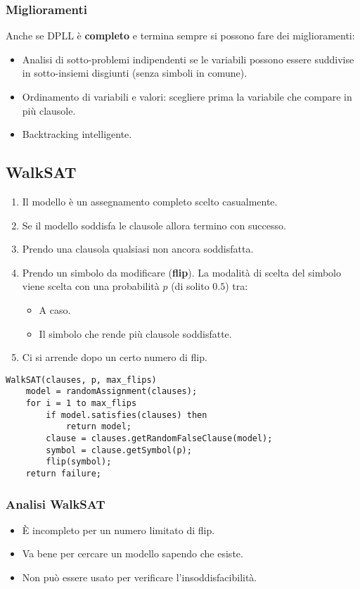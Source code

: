 \subsubsection{Miglioramenti}
Anche se DPLL \`e \textbf{completo} e termina sempre si possono fare dei miglioramenti:
\begin{itemize}
	\item Analisi di sotto-problemi indipendenti se le variabili possono essere suddivise in sotto-insiemi disgiunti
	      (senza simboli in comune).
	\item Ordinamento di variabili e valori: scegliere prima la variabile che compare in pi\`u clausole.
	\item Backtracking intelligente.
\end{itemize}

\subsection{WalkSAT}
\begin{enumerate}
	\item Il modello \`e un assegnamento completo scelto casualmente.
	\item Se il modello soddisfa le clausole allora termino con successo.
	\item Prendo una clausola qualsiasi non ancora soddisfatta.
	\item Prendo un simbolo da modificare (\textbf{flip}). La modalit\`a di scelta del simbolo viene scelta con
	      una probabilit\`a $p$ (di solito $0.5$) tra:
	      \begin{itemize}
		      \item A caso.
		      \item Il simbolo che rende pi\`u clausole soddisfatte.
	      \end{itemize}
	\item Ci si arrende dopo un certo numero di flip.
\end{enumerate}

\begin{lstlisting}[style=pseudo-style]
WalkSAT(clauses, p, max_flips)
	model = randomAssignment(clauses);
	for i = 1 to max_flips
		if model.satisfies(clauses) then
			return model;
		clause = clauses.getRandomFalseClause(model);
		symbol = clause.getSymbol(p);
		flip(symbol);
	return failure;
\end{lstlisting}

\subsubsection{Analisi WalkSAT}
\begin{itemize}
	\item \`E incompleto per un numero limitato di flip.
	\item Va bene per cercare un modello sapendo che esiste.
	\item Non pu\`o essere usato per verificare l'insoddisfacibilit\`a.
\end{itemize}

